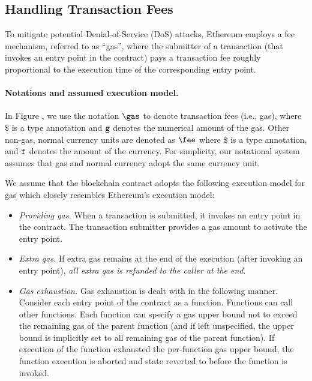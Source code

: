 


\subsection{Handling Transaction Fees}

To mitigate potential Denial-of-Service (DoS) attacks, 
Ethereum employs a fee mechanism, referred to as ``gas'', 
where the submitter of a transaction (that invokes
an entry point in the contract) pays a  
transaction fee
roughly proportional to the execution time of the 
corresponding entry point.

\paragraph{Notations and assumed execution model.}
In Figure , we
use the notation $\gas$
to denote transaction fees (i.e., gas), 
where $\$$ is a type annotation 
and ${\tt g}$ denotes the numerical amount of the  
gas. Other non-gas, normal currency units 
are denoted as $\fee$ where $\$$ is a type annotation,
and ${\tt f}$ denotes the amount of the currency. 
For simplicity, our notational system assumes 
that gas and normal currency adopt
the same currency unit. 

We assume that the blockchain contract adopts the following execution model
for gas which closely resembles Ethereum's execution model:
\begin{itemize}[leftmargin=5mm]
\item
{\it Providing gas.} 
When a transaction is submitted, it invokes an entry point in the contract.
The transaction submitter provides a gas amount to activate the entry point. 
\item
{\it Extra gas.} 
If extra gas remains at the end of the execution (after invoking an entry point),
{\it all extra gas is refunded to the caller at the end}.
\item
{\it Gas exhaustion.} 
Gas exhaustion is dealt with in the following manner.
Consider each entry point of the contract as a function. 
Functions can call other functions.
Each function can specify a gas upper bound not to exceed
the remaining gas of the parent function (and if left unspecified,
the upper bound is implicitly set to all remaining gas of the parent function).
If execution of the function exhausted the per-function gas 
upper bound, the function execution is aborted and 
state reverted to before the function is invoked.
\end{itemize}

